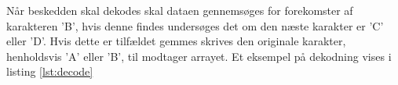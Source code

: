 Når beskedden skal dekodes skal dataen gennemsøges for forekomster af karakteren 'B', hvis denne findes undersøges det om den næste karakter er 'C' eller 'D'. Hvis dette er tilfældet gemmes skrives den originale karakter, henholdsvis 'A' eller 'B', til modtager arrayet. Et eksempel på dekodning vises i listing \ref{lst:decode}
\newpage


